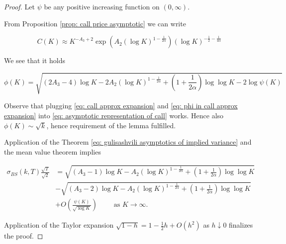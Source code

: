 \documentclass[12pt,twoside]{article}
\theoremstyle{plain}
\theoremstyle{plain}
\theoremstyle{definition}
\theoremstyle{remark}
\numberwithin{equation}{section}
\begin{document}
\begin{proof}

Let $\psi$ be any positive increasing function on $(0, \infty)$.

From Proposition \ref{prop: call price asymptotic} we can write

\begin{equation}
\label{eq: call approx expansion}
C(K) \approx K^{-A_{3}+2} \exp \left(A_{2}(\log K)^{1-\frac{1}{2 \alpha}}\right) (\log K)^{-\frac{1}{2}-\frac{1}{4 \alpha}}
\end{equation}

We see that it holds

\begin{equation}
\label{eq: phi in call approx expansion}
\phi(K)=\sqrt{\left(2 A_{3}-4\right) \log K -2 A_{2} (\log K) ^ {1 - \frac{1}{2\alpha}} +\left(1 + \frac{1}{2\alpha}\right) \log \log K-2 \log \psi(K)}
\end{equation}

Observe that plugging \eqref{eq: call approx expansion} and \eqref{eq: phi in call approx expansion} into \eqref{eq: asymptotic representation of call} works. Hence also $\phi(K) \sim \sqrt k$, hence requirement of the lemma fulfilled.

\newpage

Application of the Theorem \ref{eq: gulisashvili asymptotics of implied variance} and the mean value theorem implies

$$
\begin{aligned}
\sigma_{B S}(k, T) \frac{\sqrt{T}}{\sqrt{2}} &=\sqrt{\left(A_{3}-1\right) \log K -A_{2} (\log K)^{1-\frac{1}{2\alpha}}+\left(1 + \frac{1}{2\alpha}\right) \log \log K} \\
&-\sqrt{\left(A_{3}-2\right) \log K -A_{2} (\log K)^{1-\frac{1}{2\alpha}}+\left(1 + \frac{1}{2\alpha}\right) \log \log K} \\ &+O\left(\frac{\psi(K)}{\sqrt{\log K}}\right) \qquad \text{ as } K \rightarrow \infty.
\end{aligned}
$$

Application of the Taylor expansion $\sqrt{1-h}=1-\frac{1}{2} h+O\left(h^{2}\right)$ as $h \downarrow 0$ finalizes the proof.

\end{proof}
\end{document}
